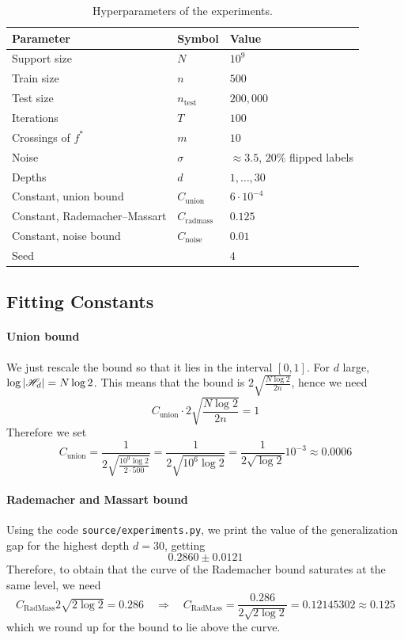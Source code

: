 \begin{table}[h!]
\centering
\begin{tabular}{lll}
\toprule
Parameter & Symbol & Value \\
\midrule
Support size & $N$ & $10^9$ \\
Train size & $n$ & $500$ \\
Test size & $n_\text{test}$ & $200,000$ \\
Iterations & $T$ & $100$ \\
Crossings of $f^*$ & $m$ & $10$ \\
Noise & $\sigma$ & $\approx 3.5$, $20\%$ flipped labels \\
Depths & $d$ & $1,\ldots,30$ \\
Constant, union bound & $C_\text{union}$ & $6\cdot 10^{-4}$ \\
Constant, Rademacher--Massart & $C_\text{radmass}$ & $0.125$ \\
Constant, noise bound & $C_\text{noise}$ & $0.01$ \\
Seed & & $4$ \\
\bottomrule
\end{tabular}
\caption{Hyperparameters of the experiments.}\label{app/tab: hyperparameters}
\end{table}

\subsection{Fitting Constants}\label{app: constants}

\paragraph{Union bound} We just rescale the bound so that it lies in the interval $[0,1]$. For $d$ large, $\log\vert\mathscr{H}_d\vert = N\log 2$. This means that the bound is $2 \sqrt{\frac{N\log 2}{2n}}$, hence we need
\[
C_\text{union}\cdot 2 \sqrt{\frac{N\log 2}{2n}} = 1
\]
Therefore we set
\[ C_\text{union} = \frac{1}{2 \sqrt{\frac{10^9\log 2}{2\cdot 500}}} = \frac{1}{2 \sqrt{ 10^6\log 2 }} = \frac{1}{2\sqrt{\log 2}}10^{-3} \approx 0.0006
\]


\paragraph{Rademacher and Massart bound} Using the code \texttt{source/experiments.py}, we print the value of the generalization gap for the highest depth $d=30$, getting 
\[
0.2860 \pm 0.0121
\]
Therefore, to obtain that the curve of the Rademacher bound saturates at the same level, we need
\[
C_{\text{RadMass}}2\sqrt{2\log 2} = 0.286 \quad \Rightarrow \quad C_{\text{RadMass}} = \frac{0.286}{2\sqrt{2\log 2}} = 0.12145302 \approx 0.125
\]
which we round up for the bound to lie above the curve. 



